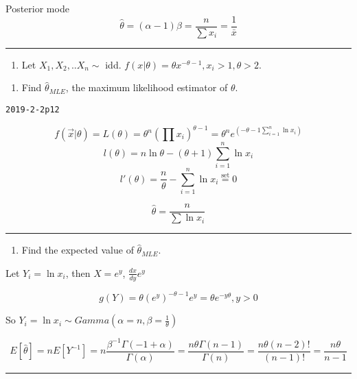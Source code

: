 \documentclass[12pt,]{article}
\providecommand{\tightlist}{%
  \setlength{\itemsep}{0pt}\setlength{\parskip}{0pt}}
\begin{document}
Posterior mode
\[\hat\theta=(\alpha-1)\beta=\frac{n}{\sum x_i}=\frac{1}{\bar x}\]

\begin{center}\rule{0.5\linewidth}{\linethickness}\end{center}

\begin{enumerate}
\def\labelenumi{\arabic{enumi}.}
\setcounter{enumi}{4}
\tightlist
\item
  \textcolor[rgb]{0.5,0.5,0.5}{Let $X_1,X_2,..X_n\sim$ idd. $f(x|\theta)=\theta x^{-\theta-1}, x_i>1, \theta>2$.}
\end{enumerate}

\begin{enumerate}
\def\labelenumi{\alph{enumi}.}
\tightlist
\item
  \textcolor[rgb]{0.5,0.5,0.5}{Find $\hat\theta_{MLE}$, the maximum likelihood estimator of $\theta$.}
\end{enumerate}

\texttt{2019-2-2p12}

\[f(\vec x|\theta)=L(\theta)=\theta^n(\prod x_i)^{\theta-1}=\theta^n e^{(-\theta-1\sum^n_{i=1} \ln x_i)}\]
\[l(\theta)=n\ln\theta-(\theta+1)\sum^n_{i=1} \ln x_i\]
\[l'(\theta)=\frac{n}\theta-\sum^n_{i=1} \ln x_i\overset{\text{set}}{=}0\]

\[\hat\theta=\frac{n}{\sum\ln x_i}\]

\begin{center}\rule{0.5\linewidth}{\linethickness}\end{center}

\begin{enumerate}
\def\labelenumi{\alph{enumi}.}
\setcounter{enumi}{1}
\tightlist
\item
  \textcolor[rgb]{0.5,0.5,0.5}{Find the expected value of $\hat\theta_{MLE}$.}
\end{enumerate}

Let \(Y_i=\ln x_i\), then \(X=e^y\), \(\frac{dx}{dy}e^y\)

\[g(Y)=\theta(e^y)^{-\theta-1}e^y=\theta e^{-y\theta}, y>0\]

So \(Y_i=\ln x_i\sim Gamma(\alpha=n,\beta=\frac1{\theta})\)

\[E[\hat\theta]=nE[Y^{-1}]=n\frac{\beta^{-1}\Gamma(-1+\alpha)}{\Gamma(\alpha)}=\frac{n\theta\Gamma(n-1)}{\Gamma(n)}=\frac{n\theta(n-2)!}{(n-1)!}=\frac{n\theta}{n-1}\]

\begin{center}\rule{0.5\linewidth}{\linethickness}\end{center}
\end{document}
